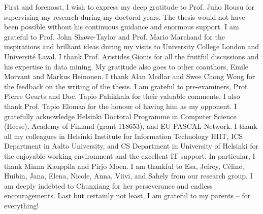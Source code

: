 

\begin{preface}[Espoo]

%
First and foremost, I wish to express my deep gratitude to Prof. Juho Rousu for supervising my research during my doctoral years.
The thesis would not have been possible without his continuous guidance and enormous support. 
%
I am grateful to Prof. John Shawe-Taylor and Prof. Mario Marchand for the inspirations and brilliant ideas during my visits to University College London and Universit\'e Laval.
%
I thank Prof. Aristides Gionis for all the fruitful discussions and his expertise in data mining.
My gratitude also goes to other coauthors, Emile Morvant and Markus Heinonen. 
%
I thank Alan Medlar and Swee Chong Wong for the feedback on the writing of the thesis.
I am grateful to pre-examiners, Prof. Pierre Geurts and Doc. Tapio Pahikkala for their valuable comments.
I also thank Prof. Tapio Elomaa for the honour of having him as my opponent.
%
I gratefully acknowledge Helsinki Doctoral Programme in Computer Science (Hecse), Academy of Finland (grant 118653), and EU PASCAL Network.
% 
I thank all my colleagues in Helsinki Institute for Information Technology HIIT, ICS Department in Aalto University, and CS Department in University of Helsinki for the enjoyable working environment and the excellent IT support.
In particular, I thank Minna Kauppila and Pirjo Moen.
%
I am thankful to Esa, Jefrey, C\'eline, Huibin, Jana, Elena, Nicole, Anna, Viivi, and Sahely from our research group.
%
I am deeply indebted to Chunxiang for her perseverance and endless encouragements.
%
Last but certainly not least, I am grateful to my parents -- for everything! 


\end{preface}
